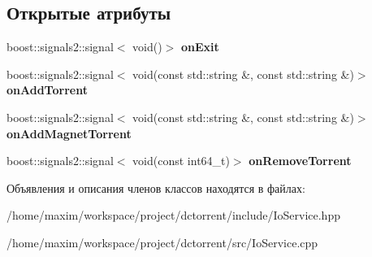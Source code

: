 \subsection*{Открытые атрибуты}
\begin{DoxyCompactItemize}
\item 
\mbox{\label{class_io_service_a73ba0e3791bb6e4ca91710e64190bdc8}} 
boost\+::signals2\+::signal$<$ void()$>$ {\bfseries on\+Exit}
\item 
\mbox{\label{class_io_service_a41f4e5cd7d74e4e460d611f963e75e80}} 
boost\+::signals2\+::signal$<$ void(const std\+::string \&, const std\+::string \&)$>$ {\bfseries on\+Add\+Torrent}
\item 
\mbox{\label{class_io_service_a1cf1999d7f3b8892c4fffcca4c70c2ab}} 
boost\+::signals2\+::signal$<$ void(const std\+::string \&, const std\+::string \&)$>$ {\bfseries on\+Add\+Magnet\+Torrent}
\item 
\mbox{\label{class_io_service_a1337445563eb8d6ceaa508e27672ca81}} 
boost\+::signals2\+::signal$<$ void(const int64\+\_\+t)$>$ {\bfseries on\+Remove\+Torrent}
\end{DoxyCompactItemize}


Объявления и описания членов классов находятся в файлах\+:\begin{DoxyCompactItemize}
\item 
/home/maxim/workspace/project/dctorrent/include/Io\+Service.\+hpp\item 
/home/maxim/workspace/project/dctorrent/src/Io\+Service.\+cpp\end{DoxyCompactItemize}
